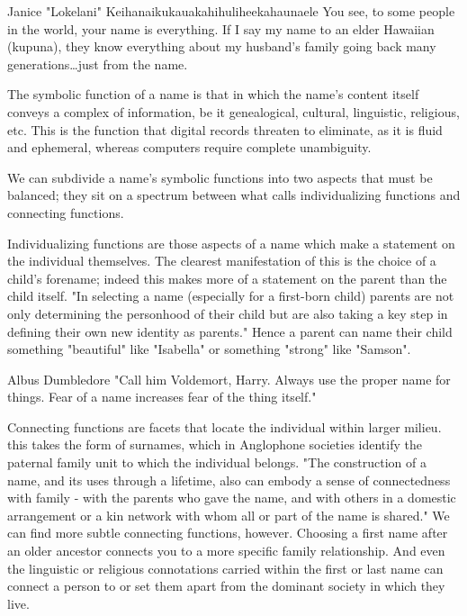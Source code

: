 \begin{aquote}{Janice "Lokelani" Keihanaikukauakahihuliheekahaunaele
	\parencite{lee-valley}}
	You see, to some people in the world, your name is everything. If I say my
	name to an elder Hawaiian (kupuna), they know everything about my husband's
	family going back many generations…just from the name.
\end{aquote}

The symbolic function of a name is that in which the name's content itself
conveys a complex of information, be it genealogical, cultural, linguistic,
religious, etc. This is the function that digital records threaten to eliminate,
as it is fluid and ephemeral, whereas computers require complete unambiguity.

We can subdivide a name's symbolic functions into two aspects that must be
balanced; they sit on a spectrum between what \textcite{finch08} calls
individualizing functions and connecting functions.

Individualizing functions are those aspects of a name which make a statement on
the individual themselves. The clearest manifestation of this is the choice of a
child's forename; indeed this makes more of a statement on the parent than the
child itself. "In selecting a name (especially for a first-born child) parents
are not only determining the personhood of their child but are also taking a key
step in defining their own new identity as parents." \parencite[718]{finch08}
Hence a parent can name their child something "beautiful" like "Isabella" or
something "strong" like "Samson".

\begin{aquote}{Albus Dumbledore}
"Call him Voldemort, Harry. Always use the proper name for things. Fear of a
name increases fear of the thing itself." \parencite{rowling97}
\end{aquote}

Connecting functions are facets that locate the individual within larger milieu.
this takes the form of surnames, which in Anglophone societies identify the
paternal family unit to which the individual belongs. "The construction of a
name, and its uses through a lifetime, also can embody a sense of connectedness
with family - with the parents who gave the name, and with others in a domestic
arrangement or a kin network with whom all or part of the name is shared."
\parencite[711]{finch08} We can find more subtle connecting functions, however.
Choosing a first name after an older ancestor connects you to a more specific
family relationship. And even the linguistic or religious connotations carried
within the first or last name can connect a person to or set them apart from the
dominant society in which they live.


